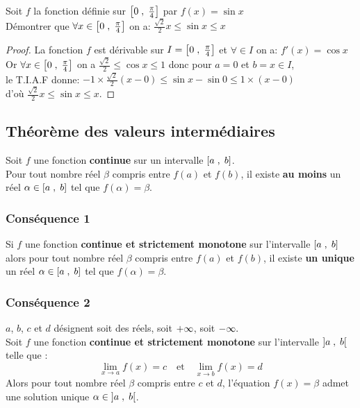 \begin{example}
\begin{exercice}
 Soit $ f $ la fonction définie sur $ \left[0\;,\; \frac{\pi}{4}\right] $ par $ f(x)= \sin x $\\
 Démontrer que $ \forall x \in \left[0\;,\; \frac{\pi}{4}\right] $ on a: $ \frac{\sqrt{2}}{2}x \leq \sin x \leq x $\\
\end{exercice}
\begin{proof}
 La fonction $ f $ est dérivable sur $ I=\left[0\;,\; \frac{\pi}{4}\right] $  et $ \forall \in I $ on a: $ f'(x)=\cos x $ \\ Or $ \forall x \in \left[0\;,\; \frac{\pi}{4}\right] $ on a $ \frac{\sqrt{2}}{2} \leq \cos x \leq 1 $ donc pour $ a=0 $ et $ b=x\in I $,\\ le T.I.A.F donne: $-1\times \frac{\sqrt{2}}{2}(x-0) \leq \sin x -\sin 0 \leq 1\times (x-0) $\\ d'où   $ \frac{\sqrt{2}}{2}x \leq \sin x \leq x $.
 \end{proof}
 \subsection{ Théorème des valeurs intermédiaires}
 \begin{theorem}[T.V.I]
 Soit $ f $ une fonction \textbf{\color{magenta}continue} sur un intervalle $ \left[a\;,\; b\right] $. \\
 Pour tout nombre réel $ \beta $ compris entre $f(a) $ et $f(b) $, il existe \textbf{\color{magenta} au moins} un réel $ \alpha \in \left[a\;,\; b\right] $ tel que $ f(\alpha)= \beta. $
 \end{theorem}
 
 \subsubsection*{Conséquence 1}
  Si $ f $ une fonction \textbf{\color{magenta}continue et strictement monotone} sur  l'intervalle $ \left[a\;,\; b\right] $ alors pour tout nombre réel $ \beta $ compris entre $f(a) $ et $f(b) $, il existe  \textbf{\color{magenta}un unique} un réel $ \alpha \in \left[a\;,\; b\right] $ tel que $ f(\alpha)= \beta. $
 \subsubsection*{Conséquence 2}
 $ a$, $b$,  $c $  et $ d$ désignent soit des réels, soit $ +\infty $, soit $ -\infty. $\\
  Soit $ f $ une fonction \textbf{\color{magenta}continue et strictement monotone} sur  l'intervalle $ \left]a \;,\; b\right[ $ telle que :
   \[\displaystyle \lim_{x \to a}f(x)=c \quad \textrm{et}\quad \displaystyle\lim_{x \to b}f(x)=d\]
Alors pour tout nombre réel $ \beta $ compris entre $c $ et $d $, l'équation $ f(x)=\beta $ admet une solution  unique $ \alpha \in \left]a \;,\; b\right[ $.\\


\end{example}
